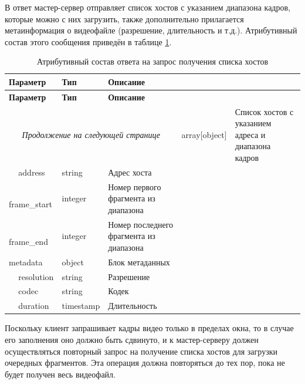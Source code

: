В ответ мастер-сервер отправляет список хостов с указанием диапазона кадров, которые можно с них загрузить, также дополнительно прилагается метаинформация о видеофайле (разрешение, длительность и т.д.). Атрибутивный состав этого сообщения приведён в таблице \ref{tbl:get_hosts_response}. 

\begin{longtable}{|p{4cm}|p{3cm}|p{8.5cm}|}
	\caption{Атрибутивный состав ответа на запрос получения списка хостов}\label{tbl:get_hosts_response}\\
	\hline
	
	\textbf{Параметр} & \textbf{Тип} & \textbf{Описание}\\ 
	\hline
	\endfirsthead
	
	\hline
	\textbf{Параметр} & \textbf{Тип} & \textbf{Описание}\\ 
	\hline
	\endhead
	
	\hline
	\multicolumn{3}{c}{\textit{Продолжение на следующей странице}}
	\endfoot
	\hline
	\endlastfoot
	
	hosts & 
	array[object] & 
	Список хостов с указанием адреса и диапазона кадров \\
	
	\hline
	\,\,\,\,\,\,\,address & 
	string & 
	Адрес хоста \\
	
	\hline
	\,\,\,\,\,\,\,frame\_start & 
	integer & 
	Номер первого фрагмента из диапазона \\
	
	\hline
	\,\,\,\,\,\,\,frame\_end & 
	integer & 
	Номер последнего фрагмента из диапазона \\
	
	\hline
	metadata & 
	object & 
	Блок метаданных \\
	
	\hline
	\,\,\,\,\,\,\,resolution & 
	string & 
	Разрешение \\
	
	\hline
	\,\,\,\,\,\,\,codec & 
	string & 
	Кодек \\
	
	\hline
	\,\,\,\,\,\,\,duration & 
	timestamp & 
	Длительность \\
\end{longtable}

Поскольку клиент запрашивает кадры видео только в пределах окна, то в случае его заполнения оно должно быть сдвинуто, и к мастер-серверу должен осуществляться повторный запрос на получение списка хостов для загрузки очередных фрагментов. Эта операция должна повторяться до тех пор, пока не будет получен весь видеофайл.

